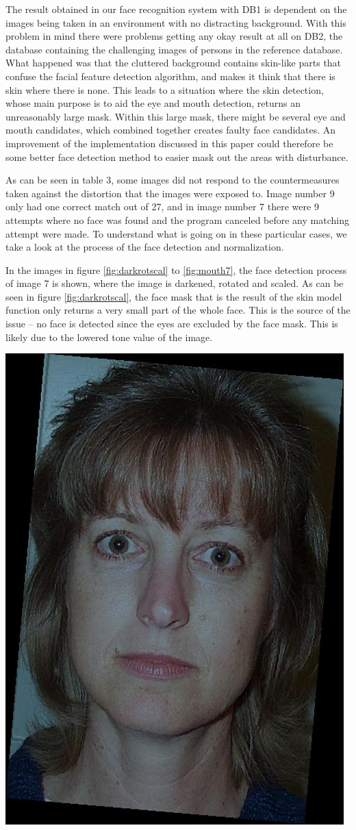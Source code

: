 The result obtained in our face recognition system with DB1 is dependent on the images being taken in an environment with no distracting background. With this problem in mind there were problems getting any okay result at all on DB2, the database containing the challenging images of persons in the reference database. What happened was that the cluttered background contains skin-like parts that confuse the facial feature detection algorithm, and makes it think that there is skin where there is none. This leads to a situation where the skin detection, whose main purpose is to aid the eye and mouth detection, returns an unreasonably large mask. Within this large mask, there might be several eye and mouth candidates, which combined together creates faulty face candidates. An improvement of the implementation discussed in this paper could therefore be some better face detection method to easier mask out the areas with disturbance.

As can be seen in table 3, some images did not respond to the countermeasures taken against the distortion that the images were exposed to. Image number 9 only had one correct match out of 27, and in image number 7 there were 9 attempts where no face was found and the program canceled before any matching attempt were made. To understand what is going on in these particular cases, we take a look at the process of the face detection and normalization.

In the images in figure \ref{fig:darkrotscal} to \ref{fig:mouth7}, the face detection process of image 7 is shown, where the image is darkened, rotated and scaled. As can be seen in figure \ref{fig:darkrotscal}, the face mask that is the result of the skin model function only returns a very small part of the whole face. This is the source of the issue – no face is detected since the eyes are excluded by the face mask. This is likely due to the lowered tone value of the image. 

\begin{Figure}
  \centering
    \includegraphics[width=0.5\columnwidth]{im7_img.jpg}
\end{Figure}

